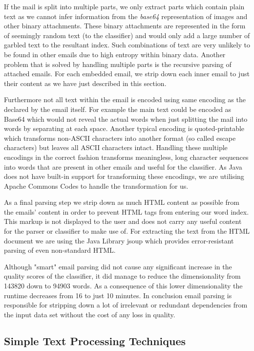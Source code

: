If the mail is split into multiple parts, we only extract parts which contain plain text as we cannot infer information from the \emph{base64} representation of images and other binary attachments.
These binary attachments are represented in the form of seemingly random text (to the classifier) and would only add a large number of garbled text \cite{rfc2045} to the resultant index. Such combinations of text are very unlikely to be found in other emails due to high entropy within binary data.
Another problem that is solved by handling multiple parts is the recursive parsing of attached emails. For each embedded email, we strip down each inner email to just their content as we have just described in this section.

Furthermore not all text within the email is encoded using same encoding as the declared by the email itself. For example the main text could be encoded as Base64 which would not reveal the actual words when just splitting the mail into words by separating at each space.
Another typical encoding is quoted-printable which transforms non-ASCII characters into another format (so called escape characters) but leaves all ASCII characters intact.
Handling these multiple encodings in the correct fashion transforms meaningless, long character sequences into words that are present in other emails and useful for the classifier.
As Java does not have built-in support for transforming these encodings, we are utilising Apache Commons Codes \cite{commons:codec} to handle the transformation for us.

As a final parsing step we strip down as much HTML content as possible from the emails' content in order to prevent HTML tags from entering our word index.
This markup is not displayed to the user and does not carry any useful content for the parser or classifier to make use of.
For extracting the text from the HTML document we are using the Java Library jsoup \cite{jsoup} which provides error-resistant parsing of even non-standard HTML.

Although "smart" email parsing did not cause any significant increase in the quality scores of the classifier, it did manage to reduce the dimensionality from 143820 down to 94903 words.
As a consequence of this lower dimensionality the runtime decreases from 16 to just 10 minutes.
In conclusion email parsing is responsible for stripping down a lot of irrelevant or redundant dependencies from the input data set without the cost of any loss in quality.

\subsection{Simple Text Processing Techniques}

